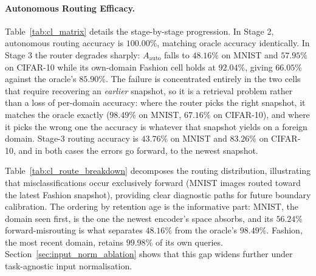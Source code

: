 \documentclass[11pt, a4paper]{article}
\begin{document}
\begin{table}[h]
\centering
\caption{\textbf{Stage-by-Stage Accuracy Evolution Matrix ($A[i, j]$).} Measured under AML Task-Oracle Snapshot Retrieval ($A_{\text{oracle}}$) and Autonomous Routing ($A_{\text{auto}}$), on the corrected evaluation path.}
\label{tab:cl_matrix}
\small
{}
\end{table}

\paragraph{Autonomous Routing Efficacy.}
Table~\ref{tab:cl_matrix} details the stage-by-stage progression. In Stage 2, autonomous routing accuracy is $100.00\%$, matching oracle accuracy identically. In Stage 3 the router degrades sharply: $A_{\text{auto}}$ falls to $48.16\%$ on MNIST and $57.95\%$ on CIFAR-10 while its own-domain Fashion cell holds at $92.04\%$, giving $66.05\%$ against the oracle's $85.90\%$. The failure is concentrated entirely in the two cells that require recovering an \emph{earlier} snapshot, so it is a retrieval problem rather than a loss of per-domain accuracy: where the router picks the right snapshot, it matches the oracle exactly ($98.49\%$ on MNIST, $67.16\%$ on CIFAR-10), and where it picks the wrong one the accuracy is whatever that snapshot yields on a foreign domain. Stage-3 routing accuracy is $43.76\%$ on MNIST and $83.26\%$ on CIFAR-10, and in both cases the errors go forward, to the newest snapshot.

Table~\ref{tab:cl_route_breakdown} decomposes the routing distribution, illustrating that misclassifications occur exclusively forward (MNIST images routed toward the latest Fashion snapshot), providing clear diagnostic paths for future boundary calibration. The ordering by retention age is the informative part: MNIST, the domain seen first, is the one the newest encoder's space absorbs, and its $56.24\%$ forward-misrouting is what separates $48.16\%$ from the oracle's $98.49\%$. Fashion, the most recent domain, retains $99.98\%$ of its own queries. Section~\ref{sec:input_norm_ablation} shows that this gap widens further under task-agnostic input normalisation.
\end{document}
